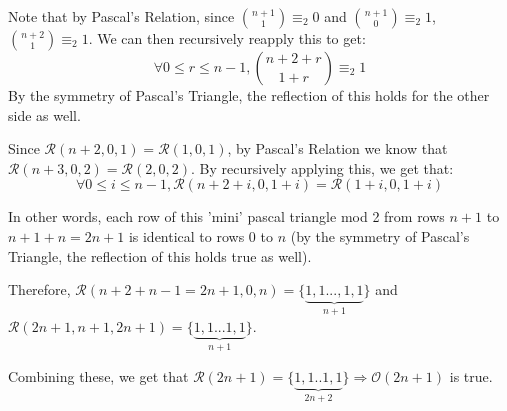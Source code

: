 \documentclass{article}
\newcommand{\pred}{\mathcal{O}}
\newcommand{\modrow}{\mathcal{R}}
\newcommand{\drawemptyrow}[4]{
    \node at (#2/4, #3/4) {#4};
    \node at (#2/-4, #3/4) {#4};
  }
\newcommand{\drawrow}[4]{
  \drawemptyrow{#1}{#2}{#3}{#4}
  \foreach \i in {0,...,#1}{
    \node at (#2/-4-\i/-2,#3/4){#4};
  }
}
\newcommand{\drawoddtriangle}[2]{
  \foreach \i in {0,...,7}{
    \drawemptyrow{\i}{#1+0+\i}{#2+7-\i}{1}
   }
   \drawrow{7}{#1+7}{#2+21}{1}
  }
\begin{document}
Note that by Pascal's Relation, since
 ${n+1 \choose 1} \equiv_2 0$ and ${n+1 \choose 0} \equiv_2 1$,
 ${n+2 \choose 1} \equiv_2 1$. We can then recursively reapply this to get:
$$
\forall 0\leq r \leq n-1, {n+2+r \choose 1+r} \equiv_2 1
$$
By the symmetry of Pascal's Triangle, the reflection of this holds for the other side as well.

\begin{figure}[H]
\centering
{}
\end{figure}

Since $\modrow(n+2,0,1) = \modrow(1,0,1)$, by Pascal's Relation we know that $\modrow(n+3,0,2) = \modrow(2,0,2)$. By recursively applying this, we get that:
$$
\forall 0 \leq i \leq n-1, \modrow(n+2+i,0,1+i) = \modrow(1+i,0,1+i)
$$

In other words, each row of this 'mini' pascal triangle mod 2 from rows $n+1$ to $n+1+n = 2n+1$ is identical to rows 0 to $n$ (by the symmetry of Pascal's Triangle, the reflection of this holds true as well).

Therefore, $\modrow(n+2+n-1=2n+1, 0, n) = \{\underbrace{1,1...,1,1}_{n+1}\}$ and
           $\modrow(2n+1,n+1, 2n+1) = \{\underbrace{1,1...1,1}_{n+1}\}$.

Combining these, we get that $\modrow(2n+1) = \{\underbrace{1,1..1,1}_{2n+2}\} \Rightarrow \pred(2n+1)$ is true.
\end{document}
